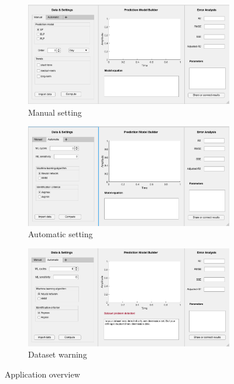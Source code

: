     \begin{figure}
        \centering
        \begin{subfigure}[b]{0.6\textwidth}
            \includegraphics[width=\textwidth]{figures/manual.png}
            \caption{Manual setting}
            \label{fig:manual}
        \end{subfigure}
        \hspace{0.1\textwidth}
        \begin{subfigure}[b]{0.6\textwidth}
            \includegraphics[width=\textwidth]{figures/auto.png}
            \caption{Automatic setting}
            \label{fig:automatic}
        \end{subfigure}
        \begin{subfigure}[b]{0.6\textwidth}
            \includegraphics[width=\textwidth]{figures/warning.png}
            \caption{Dataset warning}
            \label{fig:warning}
        \end{subfigure}
        \label{fig:appoverview}
        \caption{Application overview}
    \end{figure}
